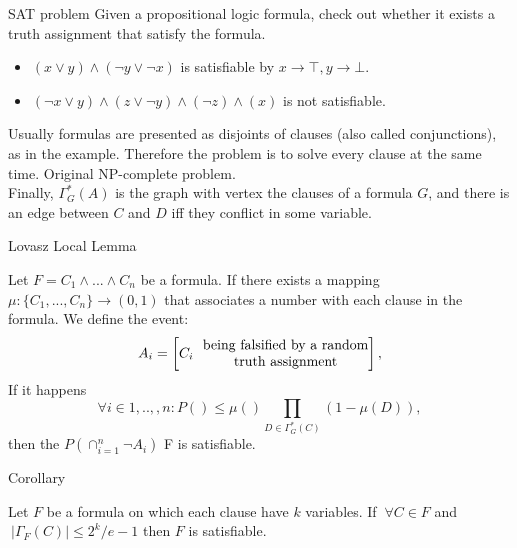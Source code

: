 \documentclass{beamer}
\begin{document}
 
\begin{frame}{SAT problem}
  Given a propositional logic formula, check out whether it exists a truth assignment that satisfy the formula.
  \begin{example}   
    \begin{itemize}
    \item $(x\lor y)\land (\neg y \lor  \neg x)$ is satisfiable by $x\to \top, y \to \bot$.
    \item    $(\neg x \lor y)\land (z\lor \neg y) \land (\neg z ) \land (x)$ is not satisfiable.
  \end{itemize}
\end{example}

Usually formulas are presented as disjoints of clauses (also called conjunctions), as in the example. Therefore the problem is to solve every clause at the same time. Original NP-complete problem.\\
Finally, $\Gamma^*_G(A)$ is the graph with vertex the clauses of a formula $G$, and there is an edge between $C$ and $D$ iff they conflict in some variable.
\end{frame}

\begin{frame}{Lovasz Local Lemma}


\begin{theorem}\label{LLLS}
  Let $F = C_1\land ... \land C_n$ be a formula. If there exists a mapping $\mu:\{C_1,...,C_n\}\to (0,1)$ that associates a number with each clause in the formula. We define the event:
  $$A_i = \left[C_i\text{ \stackanchor{ being falsified by a random}{  truth assignment}}\right],$$
	If it happens
	$$
\forall i \in 1,..,,n : P () \le \mu() \prod_{D\in\Gamma^*_G(C)} (1-\mu(D)),
$$
	then the $P(\cap_{i=1}^n \neg A_i)$ F is satisfiable.
\end{theorem}
\end{frame}

\begin{frame}{Corollary}
\begin{corollary}
	Let $F$ be a formula on which each clause have $k$ variables. If  $\ \forall C \in F$ and $\ |\Gamma_F(C)|\le 2^k/e-1$ then $F$ is satisfiable.
      \end{corollary}
      
\end{frame}
\end{document}

